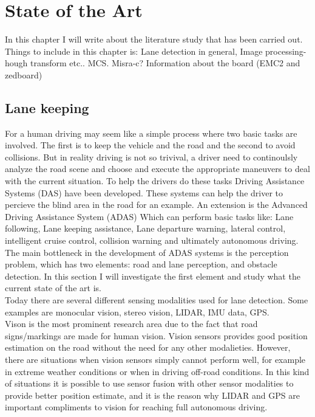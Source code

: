 \chapter{State of the Art}
In this chapter I will write about the literature study that has been carried out. Things to include in this chapter is: Lane detection in general, Image processing- hough transform etc.. MCS. Misra-c? Information about the board  (EMC2 and zedboard)

\section{Lane keeping}
For a human driving may seem like a simple process where two basic tasks are involved. The first is to keep the vehicle and the road and the second to avoid collisions. But in reality driving is not so trivival, a driver need to continoulsly analyze the road scene and choose and execute the appropriate maneuvers to deal with the current situation. To help the drivers do these tasks Driving Assistance Systems (DAS) have been developed. These systems can help the driver to percieve the blind area in the road for an example. An extension is the Advanced Driving Assistance System (ADAS) Which can perform basic tasks like: Lane following, Lane keeping assistance, Lane departure warning, lateral control, intelligent cruise control, collision warning and ultimately autonomous driving.\\

The main bottleneck in the development of ADAS systems is the perception problem, which has two elements: road and lane perception, and obstacle detection. In this section I will investigate the first element and study what the current state of the art is.\\

Today there are several different sensing modalities used for lane detection. Some examples are monocular vision, stereo vision, LIDAR, IMU data, GPS.\\


Vison is the most prominent research area due to the fact that road signs/markings are made for human vision. Vision sensors provides good position estimation on the road without the need for any other modalieties. However, there are situations when vision sensors simply cannot perform well, for example in extreme weather conditions or when in driving off-road conditions. In this kind of situations it is possible to use sensor fusion with other sensor modalities to provide better position estimate, and it is the reason why LIDAR and GPS are important compliments to vision for reaching full autonomous driving.\\




